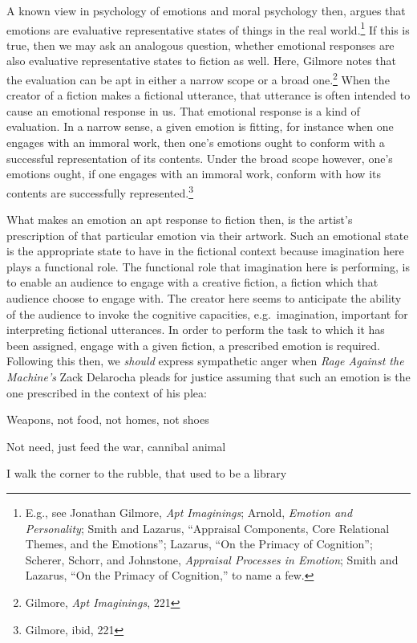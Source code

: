 \documentclass[phdthesis,12pt,final]{wuthesis}
\theoremstyle{definition}
\theoremstyle{definition}
\theoremstyle{definition}
\theoremstyle{definition}
\theoremstyle{remark}
\begin{document}
A known view in psychology of emotions and moral psychology then, argues that emotions are evaluative representative states of things in the real world.\footnote{E.g., see Jonathan Gilmore, \emph{Apt {Imaginings}}; Arnold, \emph{Emotion and {Personality}}; Smith and Lazarus, {``Appraisal {Components}, {Core Relational Themes}, and the {Emotions}''}; Lazarus, {``On the {Primacy} of {Cognition}''}; Scherer, Schorr, and Johnstone, \emph{Appraisal Processes in Emotion}; Smith and Lazarus, {``On the {Primacy} of {Cognition},''} to name a few.} If this is true, then we may ask an analogous question, whether emotional responses are also evaluative representative states to fiction as well. Here, Gilmore notes that the evaluation can be apt in either a narrow scope or a broad one.\footnote{Gilmore, \emph{Apt {Imaginings}}, 221} When the creator of a fiction makes a fictional utterance, that utterance is often intended to cause an emotional response in us. That emotional response is a kind of evaluation. In a narrow sense, a given emotion is fitting, for instance when one engages with an immoral work, then one's emotions ought to conform with a successful representation of its contents. Under the broad scope however, one's emotions ought, if one engages with an immoral work, conform with how its contents are successfully represented.\footnote{Gilmore, ibid, 221}

What makes an emotion an apt response to fiction then, is the artist's prescription of that particular emotion via their artwork. Such an emotional state is the appropriate state to have in the fictional context because imagination here plays a functional role. The functional role that imagination here is performing, is to enable an audience to engage with a creative fiction, a fiction which that audience choose to engage with. The creator here seems to anticipate the ability of the audience to invoke the cognitive capacities, e.g.~imagination, important for interpreting fictional utterances. In order to perform the task to which it has been assigned, engage with a given fiction, a prescribed emotion is required. Following this then, we \emph{should} express sympathetic anger when \emph{Rage Against the Machine's} Zack Delarocha pleads for justice assuming that such an emotion is the one prescribed in the context of his plea:

Weapons, not food, not homes, not shoes

Not need, just feed the war, cannibal animal

I walk the corner to the rubble, that used to be a library
\end{document}
